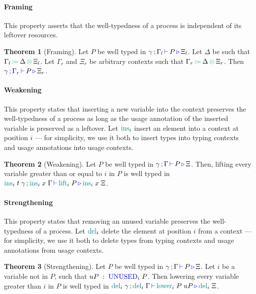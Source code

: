\documentclass[sigplan,10pt,anonymous,review]{acmart}
\theoremstyle{definition}
\newtheorem{nitheorem}{Theorem}
\newcommand{\type}[1]{\textcolor{blue}{\operatorname{#1}}}
\newcommand{\func}[1]{\textcolor{teal}{\operatorname{#1}}}
\newcommand{\opctx}[3]{#1 \, \func{\coloneqq} \, #2 \, \func{\otimes} \, #3}
\newcommand{\types}[4]{#1 \, \type{;} \, #2 \, \type{\vdash} \, #3 \, \type{\triangleright} \, #4}
\newcommand{\Unused}{\type{UNUSED}}
\begin{document}
\paragraph*{Framing}
This property asserts that the well-typedness of a process is independent of its leftover resources.

\begin{nitheorem}[Framing]
  \label{thm:framing}
  Let $P$ be well typed in $\types{\gamma}{\Gamma_l}{P}{\Xi_l}$.
  Let $\Delta$ be such that $\opctx{\Gamma_l}{\Delta}{\Xi_l}$.
  Let $\Gamma_r$ and $\Xi_r$ be arbitrary contexts such that $\opctx{\Gamma_r}{\Delta}{\Xi_r}$.
  Then $\types{\gamma}{\Gamma_r}{P}{\Xi_r}$.
\end{nitheorem}

\paragraph*{Weakening}
This property states that inserting a new variable into the context preserves the well-typedness of a process as long as the usage annotation of the inserted variable is preserved as a leftover.
Let $\func{ins}_i$ insert an element into a context at position $i$ --- for simplicity, we use it both to insert types into typing contexts and usage annotations into usage contexts.
\begin{nitheorem}[Weakening]
  \label{thm:weakening}
  Let $P$ be well typed in $\types{\gamma}{\Gamma}{P}{\Xi}$.
  Then, lifting every variable greater than or equal to $i$ in $P$ is well typed in
  $\types{\func{ins}_i \; t \; \gamma}{\func{ins}_i \; x \; \Gamma}{\func{lift}_i \; P}{\func{ins}_i \; x \; \Xi}$.
\end{nitheorem}

\paragraph*{Strengthening}
This property states that removing an unused variable preserves the well-typedness of a process.
Let $\func{del}_i$ delete the element at position $i$ from a context --- for simplicity, we use it both to delete types from typing contexts and usage annotations from usage contexts.
\begin{nitheorem}[Strengthening]
  \label{thm:strengthening} 
  Let $P$ be well typed in $\types{\gamma}{\Gamma}{P}{\Xi}$.
  Let $i$ be a variable not in $P$, such that $uP \; : \; \Unused_i \; P$.
  Then lowering every variable greater than $i$ in $P$ is well typed in $\types{\func{del}_i \; \gamma}{\func{del}_i \; \Gamma}{\func{lower}_i \; P \; uP}{\func{del}_i \; \Xi}$.
\end{nitheorem}
\end{document}
